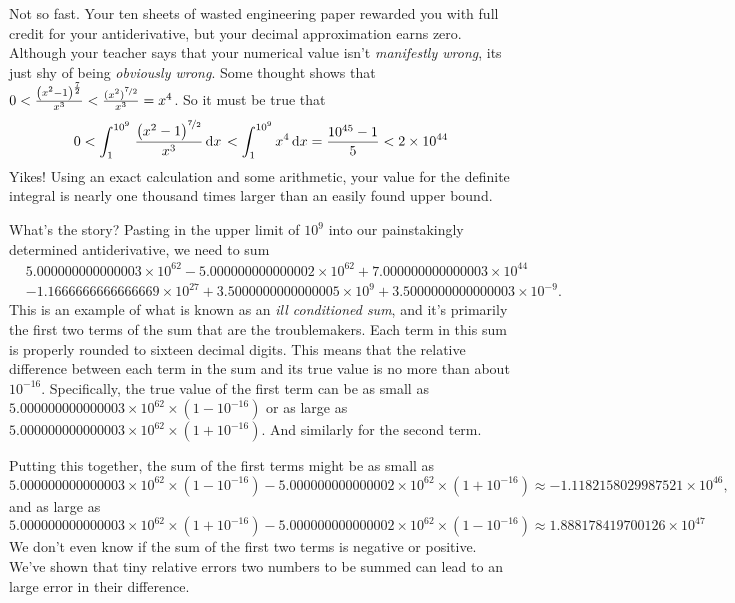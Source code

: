 \documentclass[12pt,fleqn]{article}
\newcounter{ex}\setcounter{ex}{0}
\begin{document}
Not so fast. Your ten sheets of wasted engineering paper rewarded
you with full credit for your antiderivative, but your
decimal approximation earns zero. Although your teacher says that 
your numerical value isn't \emph{manifestly wrong}, its 
just shy of being \emph{obviously wrong}. Some thought 
shows that $0 < \frac{{{\left( {{x}^{2}}-1\right) }^{\frac{7}{2}}}}{{{x}^{3}}}
< \frac{(x^2)^{\nicefrac{7}{2}}} {x^3} = x^4$. So it must be true that
\begin{equation*}
   0 <  \int_1^{10^9} {\left. \frac{{{\left( {{x}^{2}}-1\right) }^{\nicefrac{7}{2}}}}{{{x}^{3}}} \, \mathrm{d}x\right.}
       < \int_1^{10^9} x^4 \, \mathrm{d}x =  \frac{10^{45} - 1 }{5} < 2  \times 10^{44}
\end{equation*}
Yikes! Using an exact calculation and some arithmetic, your value 
for the definite integral is nearly one thousand times larger than
an easily found upper bound.

What's the story?  Pasting in the upper limit of $10^9$ into our 
painstakingly determined antiderivative, we need to sum
\begin{align*}
&5.000000000000003 \times  {{10}^{62}} - 5.000000000000002  \times 
{{10}^{62}} + 7.000000000000003 \times {{10}^{44}}  \\
&-1.1666666666666669 \times {{10}^{27}} + 
3.5000000000000005 \times {{10}^{9}} + 3.5000000000000003 \times {{10}^{-9}}.
\end{align*}
This is an example of what is known as an \emph{ill conditioned sum}, and 
it's primarily  the first two terms of the sum that are the 
troublemakers. Each term in this sum is properly rounded to sixteen 
decimal digits. This means that the relative difference between 
each term in the sum and its true value is no more than about 
$10^{-16}$. Specifically, the true value of the first term 
can be as small as $5.000000000000003 \times  {{10}^{62}} \times
(1 - 10^{-16})$ or as large as $5.000000000000003 \times  {{10}^{62}} 
\times (1 + 10^{-16})$. And similarly for the second term.

Putting this together, the sum of the first terms might be as small
as 
\begin{equation*}
  5.000000000000003 \times 10^{62} \times (1 -  10^{-16}) - 5
   .000000000000002 \times 10^{62} \times  (1  + 10^{-16})
   \approx -1.1182158029987521 \times 10^{46},
\end{equation*}
and as large as 
\begin{equation*}
  5.000000000000003 \times 10^{62} \times (1 + 10^{-16}) - 5
   .000000000000002 \times 10^{62} \times  (1  - 10^{-16})
   \approx 1.888178419700126 \times {{10}^{47}}
\end{equation*}
We don't even know if the sum of the first two terms is negative or 
positive. We've shown that tiny relative errors two numbers to be
summed can lead to an large error in their difference.
\end{document}
